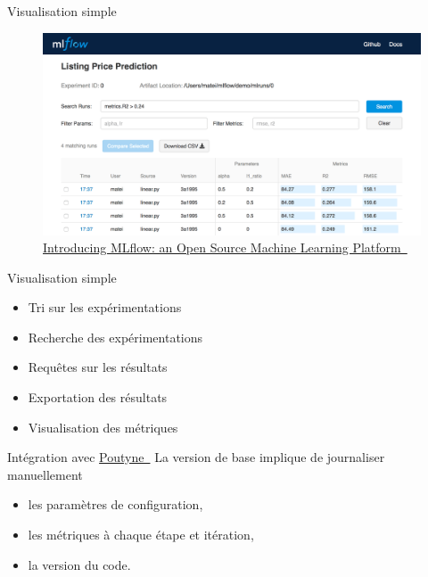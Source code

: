 \documentclass[aspectratio=169,10pt,xcolor=x11names,english,french]{beamer}
\newcommand{\link}[2]{\href{#1}{#2~{\smaller\faExternalLink*}}}
\newcommand{\guillemet}[1]{\guillemotleft #1 \guillemotright}
\begin{document}
	\begin{frame}{Visualisation simple}
		\centering
		\begin{figure}
			\includegraphics[width=\linewidth,keepaspectratio, height=0.7\textheight]{img/mlflow-ui.png}
			\caption{\link{https://databricks.com/blog/2018/06/05/introducing-mlflow-an-open-source-machine-learning-platform.html}{Introducing MLflow: an Open Source Machine Learning Platform}}
		\end{figure}
	\end{frame}

	\begin{frame}{Visualisation simple}
		\begin{itemize}
			\item Tri sur les expérimentations
			\item Recherche des expérimentations
			\item Requêtes sur les résultats
			\item Exportation des résultats
			\item Visualisation des métriques
		\end{itemize}
	\end{frame}


	\begin{frame}{Intégration avec \link{https://poutyne.org/}{Poutyne}}
		La version de \guillemet{base} implique de journaliser manuellement 
		\begin{itemize}
			\item les paramètres de configuration,
			\item les métriques à chaque étape et itération,
			\item la version du code.
		\end{itemize}
	\end{frame}
\end{document}
